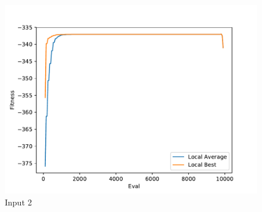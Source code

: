 \documentclass{standalone}
\begin{document}
\begin{figure}[!htb]
	\caption{Input 2}
	\label{fig:graph_2043}
	\includegraphics[width=\textwidth]{../graphs/graphs/2043.pdf}
\end{figure}
\end{document}
